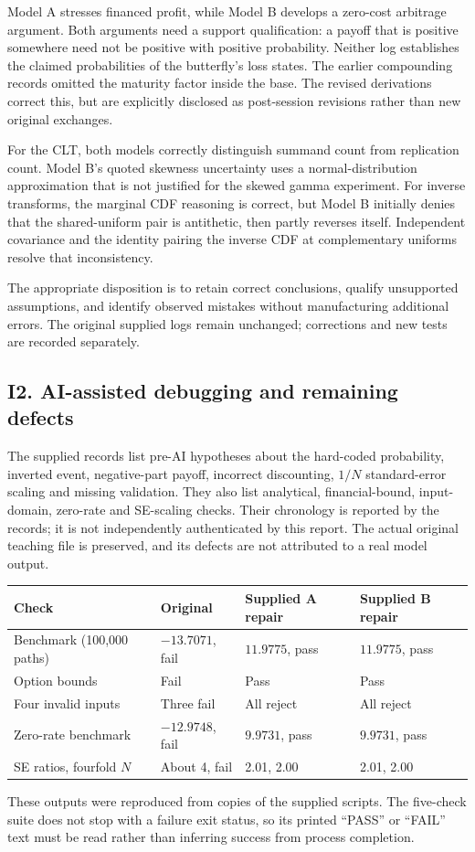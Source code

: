 Model A stresses financed profit, while Model B develops a zero-cost arbitrage argument. Both arguments need a support qualification: a payoff that is positive somewhere need not be positive with positive probability. Neither log establishes the claimed probabilities of the butterfly's loss states. The earlier compounding records omitted the maturity factor inside the base. The revised derivations correct this, but are explicitly disclosed as post-session revisions rather than new original exchanges.

For the CLT, both models correctly distinguish summand count from replication count. Model B's quoted skewness uncertainty uses a normal-distribution approximation that is not justified for the skewed gamma experiment. For inverse transforms, the marginal CDF reasoning is correct, but Model B initially denies that the shared-uniform pair is antithetic, then partly reverses itself. Independent covariance and the identity pairing the inverse CDF at complementary uniforms resolve that inconsistency.

The appropriate disposition is to retain correct conclusions, qualify unsupported assumptions, and identify observed mistakes without manufacturing additional errors. The original supplied logs remain unchanged; corrections and new tests are recorded separately.

\subsection{I2. AI-assisted debugging and remaining defects}
The supplied records list pre-AI hypotheses about the hard-coded probability, inverted event, negative-part payoff, incorrect discounting, $1/N$ standard-error scaling and missing validation. They also list analytical, financial-bound, input-domain, zero-rate and SE-scaling checks. Their chronology is reported by the records; it is not independently authenticated by this report. The actual original teaching file is preserved, and its defects are not attributed to a real model output.

\begin{center}\small\begin{tabular}{llll}\toprule
Check & Original & Supplied A repair & Supplied B repair\\\midrule
Benchmark (100,000 paths) & $-13.7071$, fail & $11.9775$, pass & $11.9775$, pass\\
Option bounds & Fail & Pass & Pass\\
Four invalid inputs & Three fail & All reject & All reject\\
Zero-rate benchmark & $-12.9748$, fail & $9.9731$, pass & $9.9731$, pass\\
SE ratios, fourfold $N$ & About 4, fail & 2.01, 2.00 & 2.01, 2.00\\\bottomrule
\end{tabular}\end{center}
These outputs were reproduced from copies of the supplied scripts. The five-check suite does not stop with a failure exit status, so its printed ``PASS'' or ``FAIL'' text must be read rather than inferring success from process completion.

